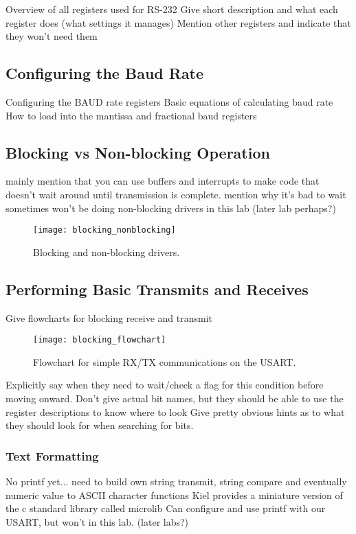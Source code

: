 \documentclass[11pt,fleqn]{book} %
\begin{document}
Overview of all registers used for RS-232
Give short description and what each register does (what settings it manages)
Mention other registers and indicate that they won't need them
\subsection{Configuring the Baud Rate}	
Configuring the BAUD rate registers
Basic equations of calculating baud rate
How to load into the mantissa and fractional baud registers
\subsection{Blocking vs Non-blocking Operation}
mainly mention that you can use buffers and interrupts to make code that doesn't wait around until transmission is complete. 
mention why it's bad to wait sometimes
won't be doing non-blocking drivers in this lab (later lab perhaps?)
\begin{figure}[]
    \centering\texttt{[image: blocking\_nonblocking]}
    \caption{Blocking and non-blocking drivers.}
    \label{blocking_nonblocking}
\end{figure}
\subsection{Performing Basic Transmits and Receives}
Give flowcharts for blocking receive and transmit
\begin{figure}[]
    \centering\texttt{[image: blocking\_flowchart]}
    \caption{Flowchart for simple RX/TX communications on the USART.}
    \label{blocking_flowchart}
\end{figure}
Explicitly say when they need to wait/check a flag for this condition before moving onward. 
Don't give actual bit names, but they should be able to use the register descriptions to know where to look
Give pretty obvious hints as to what they should look for when searching for bits.
\subsubsection{Text Formatting}
No printf yet... need to build own string transmit, string compare and eventually numeric value to ASCII character functions
Kiel provides a miniature version of the c standard library called microlib
Can configure and use printf with our USART, but won't in this lab. (later labs?)

\end{document}
